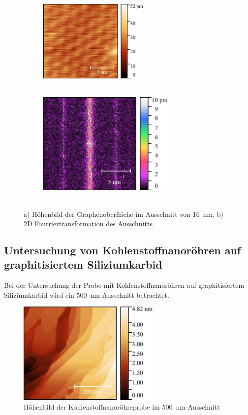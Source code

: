 \documentclass[a4paper,twoside,final]{article}
\begin{document}
\begin{figure}[htp]
    \centering
    \begin{subfigure}{0.45\textwidth}
        \includegraphics[height=4cm]{Bilder/Image02005.pdf}
        \caption{$~$}
        \label{fig:16nmGraphen}
    \end{subfigure}
    \hspace{0.5cm}
    \begin{subfigure}{0.45\textwidth}
        \includegraphics[height=5cm]{Bilder/Image02005_2DFFT.pdf}
        \caption{$~$}
        \label{fig:16nmFFT}
    \end{subfigure}
    \caption{ a) Höhenbild der Graphenoberfläche im Ausschnitt von \SI{16}{\nano\meter}, b) 2D Fourriertransformation des Ausschnitts}
\end{figure}

\subsection{Untersuchung von Kohlenstoffnanoröhren auf graphitisiertem Siliziumkarbid}
Bei der Untersuchung der Probe mit Kohlenstoffnanoröhren auf graphitisiertem Siliziumkarbid wird ein \SI{500}{\nano\meter}-Ausschnitt betrachtet.

\begin{figure}
  \centering
  \includegraphics[height=5cm]{Bilder/Image02138.pdf}
  \caption{Höhenbild der Kohlenstoffnanoröhreprobe im \SI{500}{\nano\meter}-Ausschnitt}
  \label{fig:Kohelstoffnanoröhre}
\end{figure}
\end{document}
